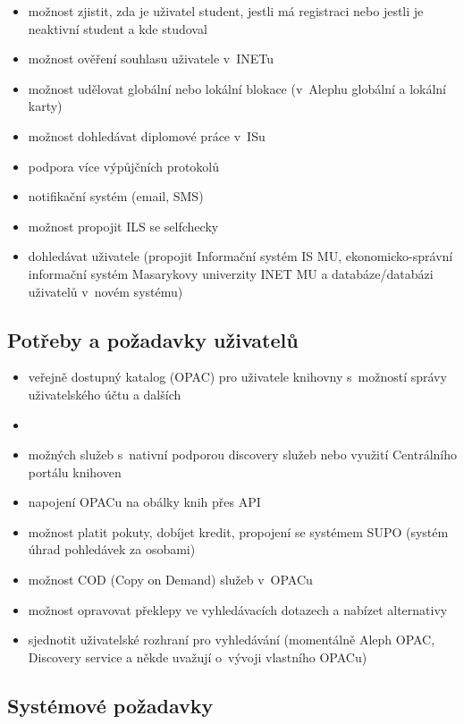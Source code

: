 \documentclass[
	11pt, oneside, printed, final, palatino, monochrome
	microtype,
	table,   %
	lof,     %
	lot     %
]{fithesis3}
\begin{document}
{\begin{itemize}
\item možnost zjistit, zda je uživatel student, jestli má registraci nebo jestli je neaktivní student a kde studoval
\item možnost ověření souhlasu uživatele v~INETu
\item možnost udělovat globální nebo lokální blokace (v~Alephu globální a lokální karty)
\item možnost dohledávat diplomové práce v~ISu
\item podpora více výpůjčních protokolů
\item notifikační systém (email, SMS)
\item možnost propojit ILS se selfchecky
\item dohledávat uživatele (propojit Informační systém IS MU, ekonomicko-správní informační systém Masarykovy univerzity INET MU a databáze/databázi uživatelů v~novém systému)
\end{itemize}

\subsection{Potřeby a požadavky uživatelů}

\begin{itemize}
\item veřejně dostupný katalog (OPAC) pro uživatele knihovny s~možností správy uživatelského účtu a dalších \item \item možných služeb s~nativní podporou discovery služeb nebo využití Centrálního portálu knihoven
\item napojení OPACu na obálky knih přes API 
\item možnost platit pokuty, dobíjet kredit, propojení se systémem SUPO (systém úhrad pohledávek za osobami)
\item možnost COD (Copy on Demand) služeb v~OPACu
\item možnost opravovat překlepy ve vyhledávacích dotazech a nabízet alternativy
\item sjednotit uživatelské rozhraní pro vyhledávání (momentálně Aleph OPAC, Discovery service a někde uvažují o~vývoji vlastního OPACu)
\end{itemize}

\subsection{Systémové požadavky}

}
\end{document}
